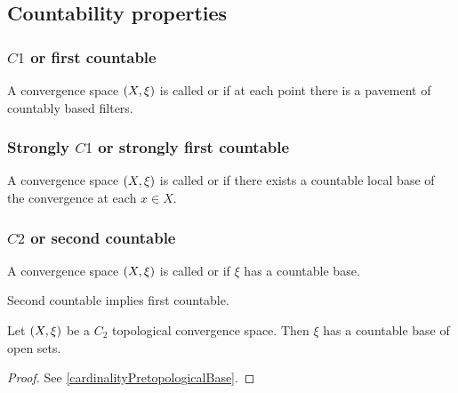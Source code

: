 \subsection{Countability properties}
\subsubsection{$C1$ or first countable}
\begin{definition}
A convergence space $\left( X, \xi \right)$ is called  or  if at each point there is a pavement of countably based filters.
\end{definition}

\subsubsection{Strongly $C1$ or strongly first countable}
\begin{definition}
A convergence space $\left( X, \xi \right)$ is called  or  if there exists a countable local base of the convergence at each $x\in X$.
\end{definition}

\subsubsection{$C2$ or second countable}
\begin{definition}
A convergence space $\left( X, \xi \right)$ is called  or  if $\xi$ has a countable base.
\end{definition}

\begin{lemma}
Second countable implies first countable.
\end{lemma}

\begin{lemma} \label{C2openBase}
Let $\left( X,\xi \right)$ be a $C_2$ topological convergence space. Then $\xi$ has a countable base of open sets.
\end{lemma}
\begin{proof}
See \ref{cardinalityPretopologicalBase}.
\end{proof}

